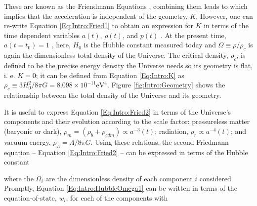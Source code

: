 \qquad These are known as the Friendmann Equations \citep{1922Friedmann,1924FriedmannCurvature}, combining them leads to
which implies that the acceleration is independent of the geometry, $K$. However, one can re-write Equation \eqref{Eq:Intro:Fried1} to obtain an expression for $K$ in terms of the time dependent variables $a(t)$, $\rho (t)$, and $p(t)$ \citep{padmanabhan_1999}. At the present time, $a(t=t_0) = 1$ \citep{1924FriedmannCurvature}, 
here, $H_0$ is the Hubble constant measured today and $\Omega \equiv \rho/\rho_c$ is again the dimensionless total density of the Universe. The critical density, $\rho_c$, is defined to be the precise energy density the Universe needs so its geometry is flat, i. e. $K=0$; it can be defined from Equation \eqref{Eq:Intro:K} as $\rho_c \equiv 3H_0^2/8\pi G = 8.098 \times 10^{-11} \text{eV}^{4}$. Figure \ref{fig:Intro:Geometry} shows the relationship between the total density of the Universe and its geometry.

\qquad It is useful to express Equation \eqref{Eq:Intro:Fried2} in terms of the Universe's components and their evolution according to the scale factor: pressureless matter (baryonic or dark), $\rho_m = (\rho_{b} + \rho_{cdm}) \propto a^{-3}(t)$; radiation, $\rho_r \propto a^{-4}(t)$; and vacuum energy, $\rho_{\Lambda} = \Lambda/8\pi G$. Using these relations, the second Friedmann equation -- Equation \eqref{Eq:Intro:Fried2} -- can be expressed in terms of the Hubble constant

where the $\Omega_i$ are the dimensionless density of each component $i$ considered
Promptly, Equation \eqref{Eq:Intro:HubbleOmega1} can be written in terms of the equation-of-state, $w_i$, for each of the components
with

